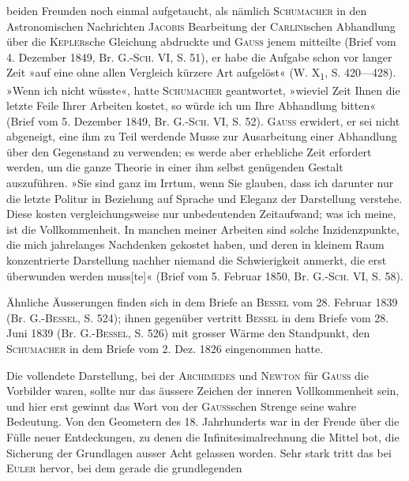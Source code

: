 beiden Freunden noch einmal aufgetaucht, als nämlich \textsc{Schumacher} in den
Astronomischen Nachrichten \textsc{Jacobis} Bearbeitung der \textsc{Carlini}schen Abhandlung
über die \textsc{Kepler}sche Gleichung abdruckte und \textsc{Gauss} jenem mitteilte (Brief
vom 4. Dezember 1849, Br. G.-\textsc{Sch.} VI, S. 51), er habe die Aufgabe schon
vor langer Zeit »auf eine ohne allen Vergleich kürzere Art aufgelöst« (W. X\textsubscript{1},
S. 420—428). »Wenn ich nicht wüsste«, hatte \textsc{Schumacher} geantwortet, »wieviel
Zeit Ihnen die letzte Feile Ihrer Arbeiten kostet, so würde ich um Ihre
Abhandlung bitten« (Brief vom 5. Dezember 1849, Br. G.-\textsc{Sch.} VI, S. 52).
\textsc{Gauss} erwidert, er sei nicht abgeneigt, eine ihm zu Teil werdende Musse
\clearpage{}\setcounter{footnote}{0}
\noindent zur Ausarbeitung einer Abhandlung über den Gegenstand zu verwenden; es
werde aber erhebliche Zeit erfordert werden, um die ganze Theorie in einer
ihm selbst genügenden Gestalt auszuführen. »Sie sind ganz im Irrtum, wenn
Sie glauben, dass ich darunter nur die letzte Politur in Beziehung auf Sprache
und Eleganz der Darstellung verstehe. Diese kosten vergleichungsweise nur
unbedeutenden Zeitaufwand; was ich meine, ist die  Vollkommenheit.
In manchen meiner Arbeiten sind solche Inzidenzpunkte, die mich jahrelanges
Nachdenken gekostet haben, und deren in kleinem Raum konzentrierte Darstellung
nachher niemand die Schwierigkeit anmerkt, die erst überwunden
werden muss[te]« (Brief vom 5. Februar 1850, Br. G.-\textsc{Sch.} VI, S. 58).
\par
Ähnliche Äusserungen finden sich in dem Briefe an \textsc{Bessel} vom 28. Februar
1839 (Br. G.-\textsc{Bessel}, S. 524); ihnen gegenüber vertritt \textsc{Bessel} in dem
Briefe vom 28. Juni 1839 (Br. G.-\textsc{Bessel}, S. 526) mit grosser Wärme den
Standpunkt, den \textsc{Schumacher} in dem Briefe vom 2. Dez. 1826 eingenommen
hatte.
\par
Die vollendete Darstellung, bei der \textsc{Archimedes} und \textsc{Newton} für \textsc{Gauss}
die Vorbilder waren, sollte nur das äussere Zeichen der inneren Vollkommenheit
sein, und hier erst gewinnt das Wort von der \textsc{Gauss}schen Strenge seine
wahre Bedeutung. Von den Geometern des 18. Jahrhunderts war in der
Freude über die Fülle neuer Entdeckungen, zu denen die Infinitesimalrechnung
die Mittel bot, die Sicherung der Grundlagen ausser Acht gelassen
worden. Sehr stark tritt das bei \textsc{Euler} hervor, bei dem gerade die grundlegenden
